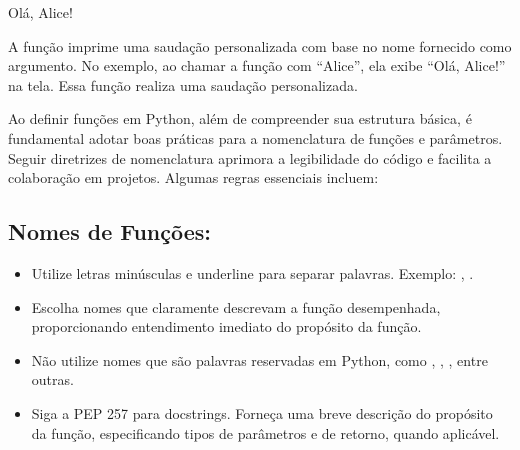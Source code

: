 \documentclass[letterpaper,10pt,english]{jupyterBook}
\begin{document}
\begin{sphinxVerbatim}[commandchars=\\\{\}]
Olá, Alice!
\end{sphinxVerbatim}

\sphinxAtStartPar
A função  imprime uma saudação personalizada com base no nome fornecido como argumento. No exemplo, ao chamar a função com “Alice”, ela exibe “Olá, Alice!” na tela. Essa função realiza uma saudação personalizada.

\sphinxAtStartPar
Ao definir funções em Python, além de compreender sua estrutura básica, é fundamental adotar boas práticas para a nomenclatura de funções e parâmetros. Seguir diretrizes de nomenclatura aprimora a legibilidade do código e facilita a colaboração em projetos. Algumas regras essenciais incluem:


\subsection{Nomes de Funções:}
\label{\detokenize{chapters/ch5/ch5:nomes-de-funcoes}}\begin{itemize}
\item {} 
\sphinxAtStartPar
{} Utilize letras minúsculas e underline para separar palavras. Exemplo: , .

\item {} 
\sphinxAtStartPar
{} Escolha nomes que claramente descrevam a função desempenhada, proporcionando entendimento imediato do propósito da função.

\item {} 
\sphinxAtStartPar
{} Não utilize nomes que são palavras reservadas em Python, como , , , entre outras.

\item {} 
\sphinxAtStartPar
{} Siga a PEP 257 para docstrings. Forneça uma breve descrição do propósito da função, especificando tipos de parâmetros e de retorno, quando aplicável.

\end{itemize}
\end{document}
